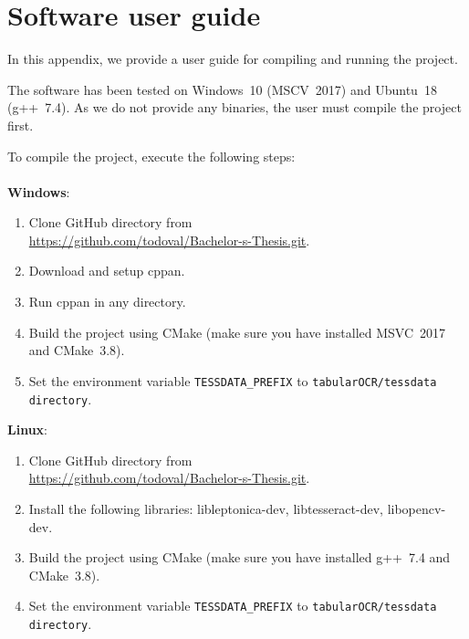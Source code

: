\chapter{Software user guide}

In this appendix, we provide a user guide for compiling and running the project.

The software has been tested on Windows~10 (MSCV~2017) and Ubuntu~18 (g++~7.4). As we do not provide any binaries, the user must compile the project first.

To compile the project, execute the following steps:\\
\\
\textbf{Windows}:
\begin{enumerate}
    \item Clone GitHub directory from\\
    \url{https://github.com/todoval/Bachelor-s-Thesis.git}.
    \item Download and setup cppan.
    \item Run cppan in any directory.
    \item Build the project using CMake (make sure you have installed MSVC~2017 and CMake~3.8).
    \item Set the environment variable \texttt{TESSDATA\_PREFIX} to \texttt{tabularOCR/tessdata directory}.
\end{enumerate}

\textbf{Linux}:
\begin{enumerate}
    \item Clone GitHub directory from\\
    \url{https://github.com/todoval/Bachelor-s-Thesis.git}.
    \item Install the following libraries: libleptonica-dev, libtesseract-dev, libopencv-dev.
    \item Build the project using CMake (make sure you have installed g++~7.4 and CMake~3.8).
    \item Set the environment variable \texttt{TESSDATA\_PREFIX} to \texttt{tabularOCR/tessdata directory}.
\end{enumerate}

